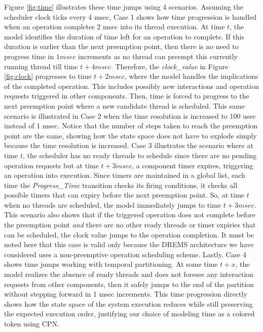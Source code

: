 Figure \ref{fig:time} illustrates these time jumps using 4 scenarios. Assuming the scheduler clock ticks every 4 msec, Case 1 shows how time progression is handled when an operation completes 2 msec into its thread execution. At time $t$, the model identifies the duration of time left for an operation to complete. If this duration is earlier than the next preemption point, then there is no need to progress time in $1 msec$ increments as no thread can preempt this currently running thread till time $t + 4 msec$. Therefore, the \emph{clock\_value} in Figure \ref{fig:clock} progresses to time $t + 2 msec$, where the model handles the implications of the completed operation. This includes possibly new interactions and operation requests triggered in other components. Then, time is forced to progress to the next preemption point where a new candidate thread is scheduled. This same scenario is illustrated in Case 2 when the time resolution is increased to 100 usec instead of 1 msec. Notice that the number of steps taken to reach the preemption point are the same, showing how the state space does not have to explode simply because the time resolution is increased. Case 3 illustrates the scenario where at time $t$, the scheduler has no ready threads to schedule since there are no pending operation requests but at time $t + 3 msec$, a component timer expires, triggering an operation into execution. Since timers are maintained in a global list, each time the \emph{Progress\_Time} transition checks its firing conditions, it checks all possible timers that can expiry before the next preemption point. So, at time $t$ when no threads are scheduled, the model immediately jumps to time $t + 3 msec$. This scenario also shows that if the triggered operation does not complete before the preemption point \emph{and} there are no other ready threads or timer expiries that can be scheduled, the clock value jumps to the operation completion. It must be noted here that this case is valid only because the DREMS architecture we have considered uses a non-preemptive operation scheduling scheme. Lastly, Case 4 shows time jumps working with temporal partitioning. At some time $t + x$, the model realizes the absence of ready threads and does not foresee any interaction requests from other components, then it safely jumps to the end of the partition without stepping forward in 1 msec increments. This time progression directly shows how the state space of the system execution reduces while still preserving the expected execution order, justifying our choice of modeling time as a colored token using CPN. 

